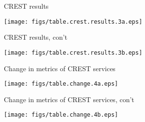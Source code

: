 \clearpage


\begin{table}[htbp]
  \begin{center}
    \caption{CREST results}
    \texttt{[image: figs/table.crest.results.3a.eps]}
    \label{table:crest.results}
  \end{center}
\end{table}

\begin{table}[htbp]
  \begin{center}
    \caption{CREST results, con't}
    \texttt{[image: figs/table.crest.results.3b.eps]}
  \end{center}
\end{table}

\begin{table}[htbp]
  \begin{center}
    \caption{Change in metrics of CREST services}
    \texttt{[image: figs/table.change.4a.eps]}
    \label{table:crest.change}
  \end{center}
\end{table}

\begin{table}[htbp]
  \begin{center}
    \caption{Change in metrics of CREST services, con't}
    \texttt{[image: figs/table.change.4b.eps]}
  \end{center}
\end{table}
